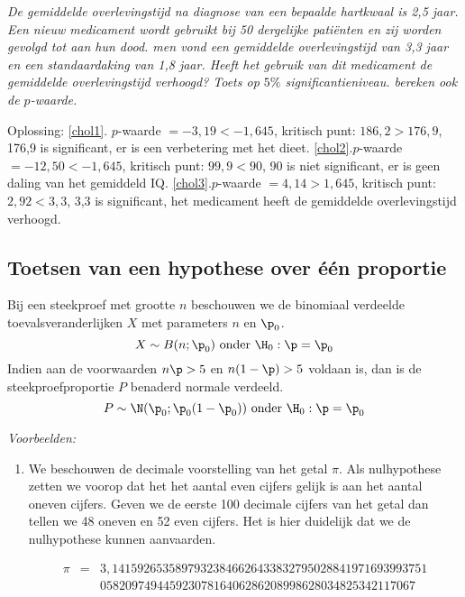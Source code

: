 {{\begin{opgave}\label{chol3}
 \em De gemiddelde overlevingstijd na diagnose van een bepaalde hartkwaal is 2,5 jaar. Een nieuw medicament wordt gebruikt bij 50 dergelijke pati\"enten en zij worden gevolgd tot aan hun dood. men vond een gemiddelde overlevingstijd van 3,3 jaar en een standaardaking van 1,8 jaar. Heeft het gebruik van dit medicament de gemiddelde overlevingstijd verhoogd? Toets op $5\%$ significantieniveau. bereken ook de $p$-waarde.
\end{opgave}



{\sc Oplossing:} \ref{chol1}.\; $p$-waarde $= -3,19<-1,645$, kritisch punt: $186,2>176,9$, 176,9 is significant, er is een verbetering met het dieet.
\ref{chol2}.\;$p$-waarde $= -12,50<-1,645$, kritisch punt: $99,9<90$, 90 is niet significant, er is geen daling van het gemiddeld IQ.
\ref{chol3}.\;$p$-waarde $= 4,14>1,645$, kritisch punt: $2,92<3,3$, 3,3 is significant, het medicament heeft de gemiddelde overlevingstijd verhoogd.

}

\subsection{Toetsen van een hypothese over \'e\'en proportie}

Bij een steekproef met grootte $n$ beschouwen we de binomiaal verdeelde  toevalsveranderlijken $X$  met parameters $n$ en $\p_0$.
 $$X\sim B(n;\p_0) \mbox{ onder }\H_0:\p=\p_0$$
 Indien aan de voorwaarden $n\p>5$ en $n(1-\p)>5$ voldaan is, dan is  de steekproefproportie $P$ benaderd normale verdeeld.
 $$P\sim \N(\p_0;\p_0 (1-\p_0)) \mbox{ onder } \H_0:\p=\p_0$$

{\em Voorbeelden:}
\begin{enumerate}

\item
We beschouwen de decimale voorstelling van het getal $\pi$. Als nulhypothese zetten we voorop dat het het aantal even cijfers gelijk is aan het aantal oneven cijfers. Geven we  de eerste 100 
decimale cijfers van het getal dan tellen we  48 oneven en 52 even cijfers. Het is hier duidelijk dat we de nulhypothese  kunnen aanvaarden. 

\begin{eqnarray*}
\pi & = &
3,
14159265358979323846626433832795028841971693993751\\
& & 05820974944592307816406286208998628034825342117067
\end{eqnarray*}



\end{enumerate}}

